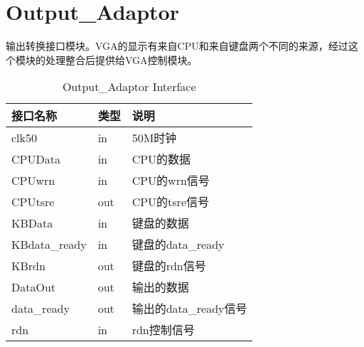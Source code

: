 
\section{Output\_Adaptor}

输出转换接口模块。VGA的显示有来自CPU和来自键盘两个不同的来源，经过这个模块的处理整合后提供给VGA控制模块。

\begin{center}
\renewcommand{\arraystretch}{1.3}
\small
\begin{longtable}{|p{3cm}<{\centering}|p{1.4cm}<{\centering}|p{7cm}<{\centering}|}
\caption{Output\_Adaptor Interface}
\label{tab:treatments}\\
\hline
接口名称 & 类型 & 说明 \\\hline
clk50 & in & 50M时钟 \\\hline
CPUData & in & CPU的数据 \\\hline
CPUwrn & in  & CPU的wrn信号 \\\hline
CPUtsre & out  & CPU的tsre信号 \\\hline
KBData & in  & 键盘的数据 \\\hline
KBdata\_ready & in & 键盘的data\_ready \\\hline
KBrdn & out & 键盘的rdn信号 \\\hline
DataOut & out & 输出的数据 \\\hline
data\_ready & out & 输出的data\_ready信号 \\\hline
rdn & in & rdn控制信号 \\\hline
\end{longtable}
\end{center}

